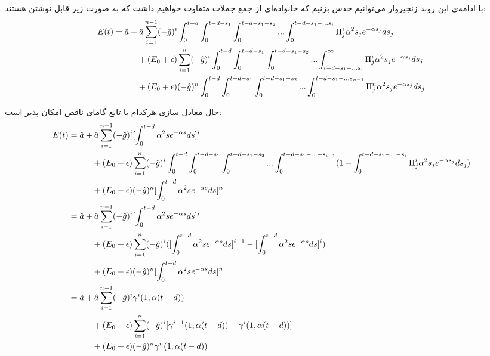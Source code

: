 با ادامه‌ی این روند زنجیروار می‌توانیم حدس بزنیم که خانواده‌ای از جمع جملات متفاوت خواهیم داشت که به صورت زیر قابل نوشتن هستند:
\begin{align}
	E(t) &= \hat{a} + \hat{a} \sum^{n - 1}_{i=1} (-\hat{g})^i \int_{0}^{t - d} \int_{0}^{t - d - s_1} \int_{0}^{t - d - s_1 - s_2} ... \int_{0}^{t - d - s_1 - ... s_i} \Pi^i_j \alpha^2 s_j e^{-\alpha s_j} ds_j \\
	&\hspace{1 cm} + (E_0 + \epsilon) \sum^{n}_{i=1} (-\hat{g})^i \int_{0}^{t - d} \int_{0}^{t - d - s_1} \int_{0}^{t - d - s_1 - s_2} ... \int_{t - d - s_1 - ... s_i}^{\infty} \Pi^i_j \alpha^2 s_j e^{-\alpha s_j} ds_j \\
	&\hspace{1 cm} + (E_0 + \epsilon) (-\hat{g})^n \int_{0}^{t - d} \int_{0}^{t - d - s_1} \int_{0}^{t - d - s_1 - s_2} ... \int_{0}^{t - d - s_1 - ... s_{n-1}} \Pi^n_j \alpha^2 s_j e^{-\alpha s_j} ds_j
\end{align}

حال معادل سازی هرکدام با تابع گاما‌ی ناقص امکان پذیر است:
\begin{align}
	E(t) &= \hat{a} + \hat{a} \sum^{n - 1}_{i=1} (-\hat{g})^i [\int_0^{t-d} \alpha^2 s e^{-\alpha s} ds]^i\\
	&\hspace{1 cm} + (E_0 + \epsilon) \sum^{n}_{i=1} (-\hat{g})^i \int_{0}^{t - d} \int_{0}^{t - d - s_1} \int_{0}^{t - d - s_1 - s_2} ... \int_0^{t - d - s_1 - ... - s_{i-1}} (1 - \int_{0}^{t - d - s_1 - ... - s_i} \Pi^i_j \alpha^2 s_j e^{-\alpha s_j} ds_j )  \\
	&\hspace{1 cm} + (E_0 + \epsilon) (-\hat{g})^n [\int_{0}^{t - d} \alpha^2 s e^{-\alpha s} ds]^n\\
	&= \hat{a} + \hat{a} \sum^{n - 1}_{i=1} (-\hat{g})^i [\int_0^{t-d} \alpha^2 s e^{-\alpha s} ds]^i\\
	&\hspace{1 cm} + (E_0 + \epsilon) \sum^{n}_{i=1} (-\hat{g})^i  ([\int_0^{t-d} \alpha^2 s e^{-\alpha s} ds]^{i-1} - [\int_0^{t-d} \alpha^2 s e^{-\alpha s} ds]^i)  \\
	&\hspace{1 cm} + (E_0 + \epsilon) (-\hat{g})^n [\int_{0}^{t - d} \alpha^2 s e^{-\alpha s} ds]^n \\
	&= \hat{a} + \hat{a} \sum^{n - 1}_{i=1} (-\hat{g})^i \gamma^i(1,\alpha(t-d))\\
	&\hspace{1 cm} + (E_0 + \epsilon) \sum^{n}_{i=1} (-\hat{g})^i  [\gamma^{i-1}(1,\alpha(t-d)) - \gamma^{i}(1,\alpha(t-d))]  \\
	&\hspace{1 cm} + (E_0 + \epsilon) (-\hat{g})^n \gamma^{n}(1,\alpha(t-d)) \\
\end{align}







